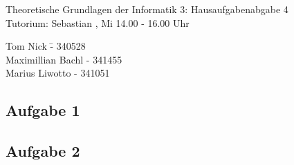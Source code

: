 \documentclass[a4paper,10pt]{article}
\begin{document}
\begin{center}
\Large{Theoretische Grundlagen der Informatik 3: Hausaufgabenabgabe 4} \\
\large{Tutorium: Sebastian , Mi 14.00 - 16.00 Uhr}
\end{center}
\begin{tabbing}
Tom Nick \hspace{2cm}\= - 340528\\
Maximillian Bachl \> - 341455 \\
Marius Liwotto\> -  341051
\end{tabbing}
	\subsection*{Aufgabe 1}
	\subsection*{Aufgabe 2}
\end{document}
